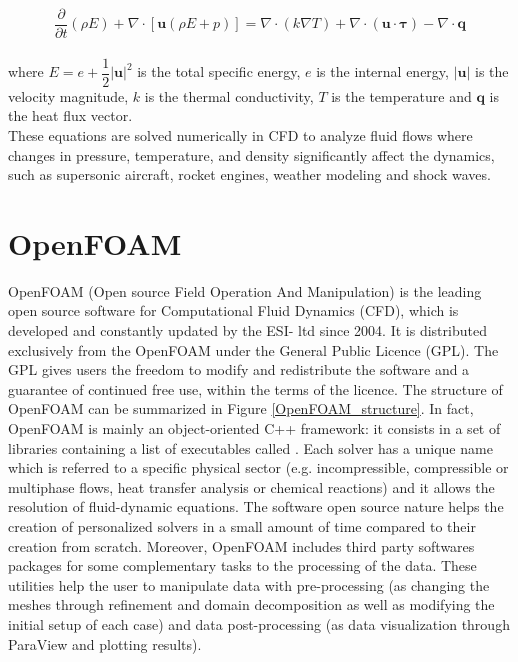 \documentclass[a5paper]{sapthesis}
\begin{document}
	\begin{equation}
		\dfrac{\partial}{\partial t} \left( \rho E \right) + \nabla \cdot \left[ \mathbf{u} (\rho E + p) \right] = \nabla \cdot \left( k \nabla T \right) + \nabla \cdot (\mathbf{u} \cdot \boldsymbol{\tau}) - \nabla \cdot \mathbf{q}
		\label{energy}
	\end{equation}
	\\
	where $E = e + \dfrac{1}{2} |\mathbf{u}|^2$ is the total specific energy, $e$ is the internal energy, $|\mathbf{u}|$ is the velocity magnitude, $k$ is the thermal conductivity, $T$ is the temperature and $\mathbf{q}$ is the heat flux vector.
	\\	
	These equations are solved numerically in CFD to analyze fluid flows where changes in pressure, temperature, and density significantly affect the dynamics, such as supersonic aircraft, rocket engines, weather modeling and shock waves.
	
	
	\section{OpenFOAM}
	OpenFOAM (Open source Field Operation And Manipulation) is the leading open source software for Computational Fluid Dynamics (CFD), which is developed and constantly updated by the ESI-\citet{OpenFOAM_ESI} ltd since 2004. It is distributed exclusively from the OpenFOAM \citet{OpenFOAMFoundation} under the General Public Licence (GPL). The GPL gives users the freedom to modify and redistribute the software and a guarantee of continued free use, within the terms of the licence.
	The structure of OpenFOAM  can be summarized in Figure \ref{OpenFOAM_structure}. In fact, OpenFOAM is mainly an object-oriented C++ framework: it consists in a set of libraries containing a list of executables called . Each solver has a unique name which is referred to a specific physical sector (e.g. incompressible, compressible or multiphase flows, heat transfer analysis or chemical reactions) and it allows the resolution of fluid-dynamic equations. The software open source nature helps the creation of personalized solvers in a small amount of time compared to their creation from scratch. Moreover, OpenFOAM includes third party softwares packages for some complementary tasks to the processing of the data. These utilities help the user to  manipulate data with pre-processing (as changing the meshes through refinement and domain decomposition as well as modifying the initial setup of each case) and data post-processing (as data visualization through ParaView and plotting results). 
	
\end{document}
